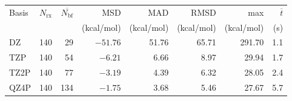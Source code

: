 \small
\begin{tabular}{@{}lrrrrrrr@{}}
  \toprule
  Basis & $N_\mathrm{rx}$ & $\overline{N_\mathrm{bf}}$ & MSD & MAD & RMSD & max & $\overline{t}$ \\
   &  &  & (kcal/mol) & (kcal/mol) & (kcal/mol) & (kcal/mol) & (s) \\
  \midrule
  DZ & 140 & 29 & $-51.76$ & 51.76 & 65.71 & 291.70 & 1.1 \\
  TZP & 140 & 54 & $-6.21$ & 6.66 & 8.97 & 29.94 & 1.7 \\
  TZ2P & 140 & 77 & $-3.19$ & 4.39 & 6.32 & 28.05 & 2.4 \\
  QZ4P & 140 & 134 & $-1.75$ & 3.68 & 5.46 & 27.67 & 5.7 \\
  \bottomrule
\end{tabular}
